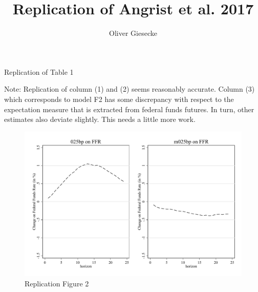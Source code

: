 \documentclass{article}
\begin{document}
\title{Replication of Angrist et al. 2017}
\author{Oliver Giesecke}

\maketitle 

\begin{table}[h!]
	\begin{center}
		
	\end{center}
\caption{Replication of Table 1}
\end{table}

Note: Replication of column (1) and (2) seems reasonably accurate. Column (3) which corresponds to model F2 has some discrepancy with respect to the expectation measure that is extracted from federal funds futures. In turn, other estimates also deviate slightly. This needs a little more work.

\begin{figure}
	\begin{center}
			\includegraphics[scale=0.6]{../../output/fig_ffrrate_repl.pdf}
			\caption{Replication Figure 2}
	\end{center}
\end{figure}
\end{document}
